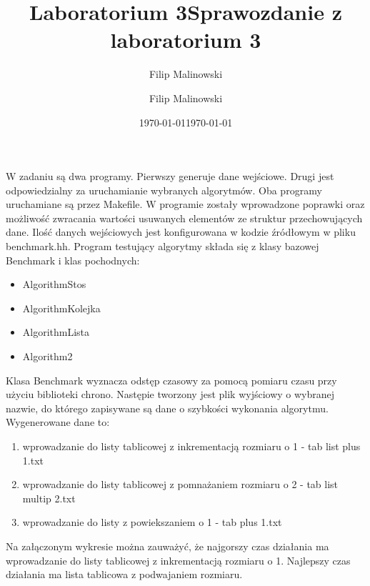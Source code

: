 \documentclass[a4paper,10pt]{scrartcl}
\title{Laboratorium 3}
\author{Filip Malinowski}
\date{\today}
\begin{document}
\title{Sprawozdanie z laboratorium 3}
\author{Filip Malinowski}
\date{\today}

\maketitle

W zadaniu są dwa programy. Pierwszy generuje dane wejściowe.
Drugi jest odpowiedzialny za uruchamianie wybranych algorytmów.
Oba programy uruchamiane są przez Makefile.
W programie zostały wprowadzone poprawki oraz możliwość zwracania
wartości usuwanych elementów ze struktur przechowujących dane.
Ilość danych wejściowych jest konfigurowana w kodzie źródłowym
w pliku benchmark.hh.
Program testujący algorytmy składa się z klasy bazowej
Benchmark i klas pochodnych:
\begin{itemize}
 \item AlgorithmStos
 \item AlgorithmKolejka
 \item AlgorithmLista
 \item Algorithm2
\end{itemize}

Klasa Benchmark wyznacza odstęp czasowy za pomocą pomiaru czasu
przy użyciu biblioteki chrono. Następie tworzony jest plik
wyjściowy o wybranej nazwie, do którego zapisywane są
dane o szybkości wykonania algorytmu. Wygenerowane dane to:
\begin{enumerate}
 \item wprowadzanie do listy tablicowej z inkrementacją rozmiaru o 1 - tab list plus 1.txt
 \item wprowadzanie do listy tablicowej z pomnażaniem rozmiaru o 2 - tab list multip 2.txt
 \item wprowadzanie do listy z powiekszaniem o 1 - tab plus 1.txt
\end{enumerate}

Na załączonym wykresie można zauważyć, że najgorszy czas działania
ma wprowadzanie do listy tablicowej z inkrementacją rozmiaru o 1.
Najlepszy czas działania ma lista tablicowa z podwajaniem rozmiaru.
\end{document}
